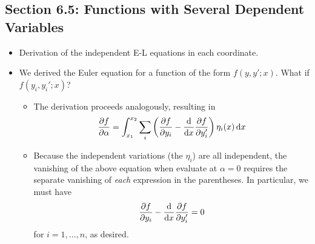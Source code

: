 \documentclass[../notes.tex]{subfiles}
\begin{document}
\subsection*{Section 6.5: Functions with Several Dependent Variables}
\begin{itemize}
    \item Derivation of the independent E-L equations in each coordinate.
    \item We derived the Euler equation for a function of the form $f(y,y';x)$. What if $f(y_i,y_i';x)$?
    \begin{itemize}
        \item The derivation proceeds analogously, resulting in
        \begin{equation*}
            \pdv{f}{\alpha} = \int_{x_1}^{x_2}\sum_i\left( \pdv{f}{y_i}-\dv{x}\pdv{f}{y_i'} \right)\eta_i(x)\dd{x}
        \end{equation*}
        \item Because the independent variations (the $\eta_i$) are all independent, the vanishing of the above equation when evaluate at $\alpha=0$ requires the separate vanishing of \emph{each} expression in the parentheses. In particular, we must have
        \begin{equation*}
            \pdv{f}{y_i}-\dv{x}\pdv{f}{y_i'} = 0
        \end{equation*}
        for $i=1,\dots,n$, as desired.
    \end{itemize}
\end{itemize}
\end{document}
